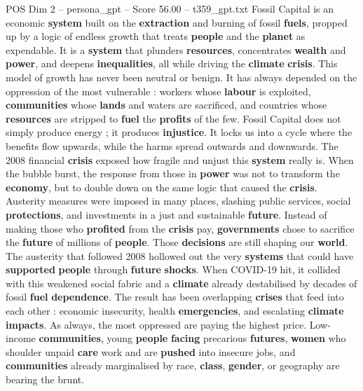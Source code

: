 \begin{textsample}{POS Dim 2 – persona\_gpt – Score 56.00 – t359\_gpt.txt}  \label{ex:f2_pos_020}
Fossil Capital is an economic \textbf{system} built on the \textbf{extraction} and burning of fossil \textbf{fuels}, propped up by a logic of endless growth that treats \textbf{people} and the \textbf{planet} as expendable.
It is a \textbf{system} that plunders \textbf{resources}, concentrates \textbf{wealth} and \textbf{power}, and deepens \textbf{inequalities}, all while driving the \textbf{climate} \textbf{crisis}.
This model of growth has never been neutral or benign.
It has always depended on the oppression of the most vulnerable : workers whose \textbf{labour} is exploited, \textbf{communities} whose \textbf{lands} and waters are sacrificed, and countries whose \textbf{resources} are stripped to \textbf{fuel} the \textbf{profits} of the few.
Fossil Capital does not simply produce energy ; it produces \textbf{injustice}.
It locks us into a cycle where the benefits flow upwards, while the harms spread outwards and downwards.
The 2008 financial \textbf{crisis} exposed how fragile and unjust this \textbf{system} really is.
When the bubble burst, the response from those in \textbf{power} was not to transform the \textbf{economy}, but to double down on the same logic that caused the \textbf{crisis}.
Austerity measures were imposed in many places, slashing public services, social \textbf{protections}, and investments in a just and sustainable \textbf{future}.
Instead of making those who \textbf{profited} from the \textbf{crisis} pay, \textbf{governments} chose to sacrifice the \textbf{future} of millions of \textbf{people}.
Those \textbf{decisions} are still shaping our \textbf{world}.
The austerity that followed 2008 hollowed out the very \textbf{systems} that could have \textbf{supported} \textbf{people} through \textbf{future} \textbf{shocks}.
When COVID-19 hit, it collided with this weakened social fabric and a \textbf{climate} already destabilised by decades of fossil \textbf{fuel} \textbf{dependence}.
The result has been overlapping \textbf{crises} that feed into each other : economic insecurity, health \textbf{emergencies}, and escalating \textbf{climate} \textbf{impacts}.
As always, the most oppressed are paying the highest price.
Low-income \textbf{communities}, young \textbf{people} \textbf{facing} precarious \textbf{futures}, \textbf{women} who shoulder unpaid \textbf{care} work and are \textbf{pushed} into insecure jobs, and \textbf{communities} already marginalised by race, \textbf{class}, \textbf{gender}, or geography are bearing the brunt.

\end{textsample}
